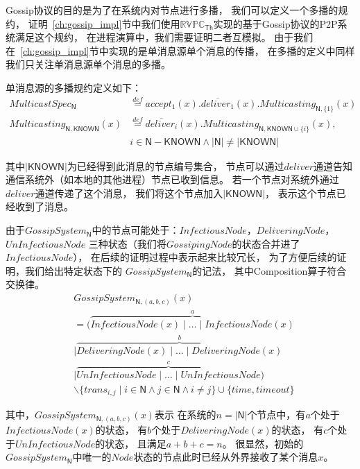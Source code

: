 Gossip协议的目的是为了在系统内对节点进行多播，
我们可以定义一个多播的规约，
证明~\ref{ch:gossip_impl}节中我们使用$\mathbb{RVPC}_{\mathsf{Th}}$实现的基于Gossip协议的P2P系统满足这个规约，
在进程演算中，我们需要证明二者互模拟。
由于我们在~\ref{ch:gossip_impl}节中实现的是单消息源单个消息的传播，
在多播的定义中同样我们只关注单消息源单个消息的多播。
\begin{definition} 单消息源的多播规约定义如下：
\begin{equation} 
   \begin{split}
    MulticastSpec_\mathsf{N}&\stackrel{def}{=}accept_1(x).\overline{deliver_1}(x).Multicasting_{\mathsf{N},\{1\}}(x)\\
    Multicasting_{\mathsf{N},\mathsf{KNOWN}}(x)&\stackrel{def}{=}\overline{deliver_i}(x).Multicasting_{\mathsf{N},\mathsf{KNOWN}\cup\{i\}}(x), \\
    &i\in \mathsf{N}-\mathsf{KNOWN} \wedge |\mathsf{N}|\neq |\mathsf{KNOWN}|
   \end{split}
   \end{equation}
\end{definition} 
其中$|\mathsf{KNOWN}|$为已经得到此消息的节点编号集合，
节点可以通过$deliver$通道告知通信系统外（如本地的其他进程）节点已收到信息。
若一个节点对系统外通过$deliver$通道传递了这个消息，
我们将这个节点加入$|\mathsf{KNOWN}|$，
表示这个节点已经收到了消息。

 \begin{definition} 
   由于$GossipSystem_{\mathsf{N}}$中的节点可能处于：$InfectiousNode$，$DeliveringNode$，$UnInfectiousNode$
   三种状态（我们将$GossipingNode$的状态合并进了$InfectiousNode$），
   在后续的证明过程中表示起来比较冗长，
   为了方便后续的证明，我们给出特定状态下的
   $GossipSystem_{\mathsf{N}}$的记法，
   其中Composition算子符合交换律。
    \begin{equation}
      \begin{split}
   &GossipSystem_{\mathsf{N},(a,b,c)}(x)\\
   &= (\stackrel{a}{\overbrace{InfectiousNode(x)\mid \dots \mid InfectiousNode(x)}}\\
   &\mid \stackrel{b}{\overbrace{DeliveringNode(x)\mid \dots\mid DeliveringNode(x)}}\\
   &\mid \stackrel{c}{\overbrace{UnInfectiousNode\mid \dots \mid UnInfectiousNode}})\\
   &\backslash \{trans_{i,j}\mid i\in \mathsf{N} \wedge j\in \mathsf{N} \wedge i\neq j\}\cup \{time, timeout\}
      \end{split}
\end{equation}
 \end{definition}
 其中，$GossipSystem_{\mathsf{N},(a,b,c)}(x)$表示
 在系统的$n=|\mathsf{N}|$个节点中，有$a$个处于$InfectiousNode(x)$的状态，
 有$b$个处于$DeliveringNode(x)$的状态，
 有$c$个处于$UnInfectiousNode$的状态，
 且满足$a+b+c=n$。
 很显然，初始的$GossipSystem_{\mathsf{N}}$中唯一的$Node$状态的节点此时已经从外界接收了某个消息$x$。

